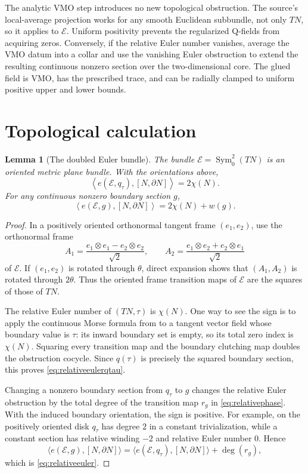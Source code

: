 \documentclass[11pt]{article}
\newtheorem{lemma}[theorem]{Lemma}
\theoremstyle{definition}
\theoremstyle{remark}
\newcommand{\E}{\mathcal E}
\newcommand{\Sym}{\operatorname{Sym}}
\newcommand{\bd}{\partial}
\begin{document}
The analytic VMO step introduces no new topological obstruction.  The
source's local-average projection works for any smooth Euclidean subbundle,
not only $TN$, so it applies to $\E$.  Uniform positivity prevents the
regularized Q-fields from acquiring zeros.  Conversely, if the relative Euler
number vanishes, average the VMO datum into a collar and use the vanishing
Euler obstruction to extend the resulting continuous nonzero section over the
two-dimensional core.  The glued field is VMO, has the prescribed trace, and
can be radially clamped to uniform positive upper and lower bounds.

\section{Topological calculation}

\begin{lemma}[The doubled Euler bundle]\label{lem:double}
The bundle $\E=\Sym^2_0(TN)$ is an oriented metric plane bundle.  With the
orientations above,
\begin{equation}\label{eq:relativeeulerqtau}
 \left\langle e(\E,q_\tau),[N,\bd N]\right\rangle=2\chi(N).
\end{equation}
For any continuous nonzero boundary section $g$,
\begin{equation}\label{eq:relativeeuler}
 \left\langle e(\E,g),[N,\bd N]\right\rangle
   =2\chi(N)+w(g).
\end{equation}
\end{lemma}

\begin{proof}
In a positively oriented orthonormal tangent frame $(e_1,e_2)$, use the
orthonormal frame
\begin{equation}\label{eq:Eframe}
 A_1=\frac{e_1\otimes e_1-e_2\otimes e_2}{\sqrt2},
 \qquad
 A_2=\frac{e_1\otimes e_2+e_2\otimes e_1}{\sqrt2}
\end{equation}
of $\E$.  If $(e_1,e_2)$ is rotated through $\theta$, direct expansion shows
that $(A_1,A_2)$ is rotated through $2\theta$.  Thus the oriented frame
transition maps of $\E$ are the squares of those of $TN$.

The relative Euler number of $(TN,\tau)$ is $\chi(N)$.  One way to see the
sign is to apply the continuous Morse formula from \cite{CSV} to a tangent
vector field whose boundary value is $\tau$: its inward boundary set is
empty, so its total zero index is $\chi(N)$.  Squaring every transition map
and the boundary clutching map doubles the obstruction cocycle.  Since
$q(\tau)$ is precisely the squared boundary section, this proves
\eqref{eq:relativeeulerqtau}.

Changing a nonzero boundary section from $q_\tau$ to $g$ changes the relative
Euler obstruction by the total degree of the transition map $r_g$ in
\eqref{eq:relativephase}.  With the induced boundary orientation, the sign is
positive.  For example, on the positively oriented disk $q_\tau$ has degree
$2$ in a constant trivialization, while a constant section has relative
winding $-2$ and relative Euler number $0$.  Hence
\[
 \langle e(\E,g),[N,\bd N]\rangle
 =\langle e(\E,q_\tau),[N,\bd N]\rangle+\deg(r_g),
\]
which is \eqref{eq:relativeeuler}.
\end{proof}
\end{document}
